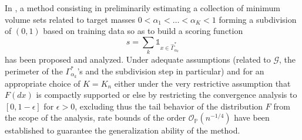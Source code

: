 In \cite{CLEM13}, a method consisting in preliminarily estimating a collection of minimum volume sets related to target masses $0<\alpha_1<\ldots<\alpha_K<1$ forming a subdivision of $(0,1)$ based on training data so as to build a scoring function $$s=\sum_k \mathds{1}_{x\in \hat \Gamma_{\alpha_k}^*}$$ has been proposed and analyzed. Under adequate assumptions (related to $\mathcal{G}$, the perimeter of the $\Gamma^*_{\alpha_k}$'s and the subdivision step in particular) and for an appropriate choice of $K=K_n$ either under the very restrictive assumption that $F(dx)$ is compactly supported or else by restricting the convergence analysis to $[0,1-\epsilon]$ for $\epsilon>0$, excluding thus the tail behavior of the distribution $F$ from the scope of the analysis, rate bounds of the order $\mathcal{O}_{\mathbb{P}}(n^{-1/4})$ have been established to guarantee the generalization ability of the method.

